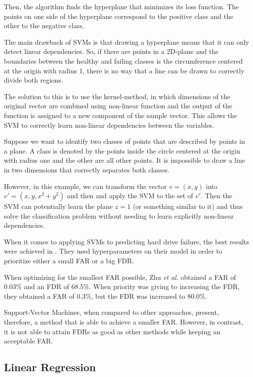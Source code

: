 Then, the algorithm finds the hyperplane that minimizes its loss function.
The points on one side of the hyperplane correspond to the positive class and the other to the negative class.

The main drawback of SVMs is that drawing a hyperplane means that it can only detect linear dependencies.
So, if there are points in a 2D-plane and the boundaries between the healthy and failing classes is the circumference centered at the origin with radius 1, there is no way that a line can be drawn to correctly divide both regions.

The solution to this is to use the kernel-method, in which dimensions of the original vector are combined using non-linear function and the output of the function is assigned to a new component of the sample vector.
This allows the SVM to correctly learn non-linear dependencies between the variables.

Suppose we want to identify two classes of points that are described by points in a plane.
A class is denoted by the points inside the circle centered at the origin with radius one and the other are all other points.
It is impossible to draw a line in two dimensions that correctly separates both classes.

However, in this example, we can transform the vector $v = (x, y)$ into $v' = (x, y, x^2 + y^2)$ and then and apply the SVM to the set of $v'$.
Then the SVM can potentially learn the plane $z = 1$ (or something similar to it) and thus solve the classification problem without needing to learn explicitly non-linear dependencies.

When it comes to applying SVMs to predicting hard drive failure, the best results were achieved in \cite{Zhu13}.
They used hyperparameters on their model in order to prioritize either a small FAR or a big FDR.

When optimizing for the smallest FAR possible, Zhu \textit{et al.} obtained a FAR of $0.03\%$ and an FDR of $68.5\%$.
When priority was giving to increasing the FDR, they obtained a FAR of $0.3\%$, but the FDR was increased to $80.0\%$.

Support-Vector Machines, when compared to other approaches, present, therefore, a method that is able to achieve a smaller FAR.
However, in contrast, it is not able to attain FDRs as good as other methods while keeping an acceptable FAR.

\subsection{Linear Regression}

